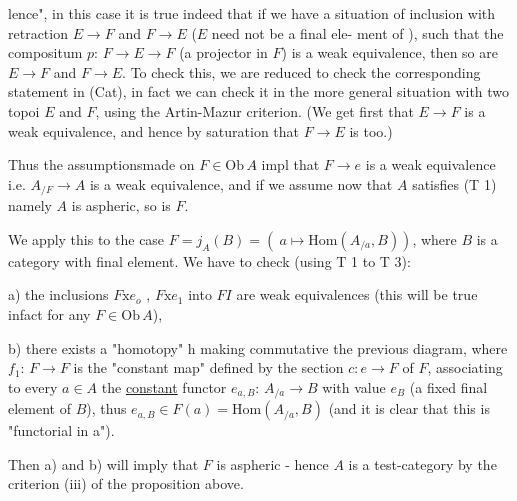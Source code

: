 
lence",  in this case it is true indeed that if we have a situation of
inclusion with retraction  $E\to F$ and $F\to E$  ($E$ need not be a final ele-%
ment of  ),  such that the compositum  $p$: $F\to E\to F$  (a projector in
$F$) is a weak equivalence,  then so are $E\to F$ and $F\to E$.  To check this,
we are reduced to check the corresponding statement in (Cat),  in fact we
can check it in the more general situation with two topoi $E$ and $F$,  using
the Artin-Mazur criterion.  (We get first that $E\to F$ is a weak equivalence,
and hence by saturation that $F\to E$ is too.)

Thus the assumptions\hand{/}made on $F\in \mathrm{Ob}\,A\hat{}$ impl that  $F\to e$ is a weak
equivalence i.e.  $A_{/F}\to A$ is a weak equivalence,  and if we assume now
that $A$ satisfies (T 1) namely $A$ is aspheric,  so is $F$.

We apply this to the case  $F = j_A(B) = (\ a\mapsto \mathrm{Hom}(A_{/a},B))$,  where $B$
is a \inserted{[small],} category with final element.  We have to check (using T 1 to T 3):

a) the inclusions  $F\mathrm{x}e_o$ , $F\mathrm{x}e_1$ into $F$$I$ are weak equivalences (this will
be true in\hand{/}fact for any $F\in\mathrm{Ob}\,A$\hand{\unsure{$\hat{}$}}),

b) there exists a "homotopy" h making commutative the previous diagram,
where  $f_1$:  $F\to F$ is the "constant map" defined by the section
$c : e\to F$ of $F$,  associating to every $a\in A$ the \uline{constant} functor
$e_{a,B}$: $A_{/a}\to B$  with value $e_B$ (a fixed final element of $B$),  thus
$e_{a,B}\in F(a) = \mathrm{Hom}(A_{/a},B)$  (and it is clear that this is "functorial
in a").

Then  a) and b) will imply that $F$ is aspheric - hence $A$ is a test-category
by the criterion (iii) of the proposition above.

